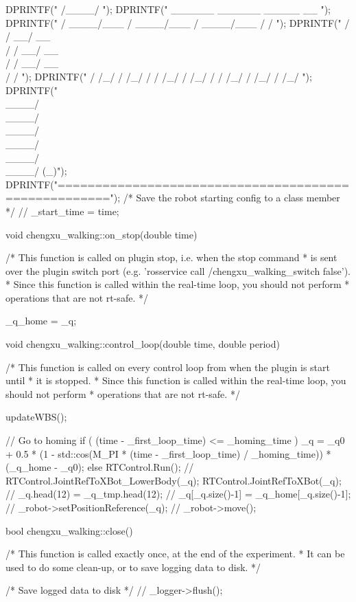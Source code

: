 {{{		DPRINTF("               /____/                                    \n");
		DPRINTF("     ______         ______         _____          __    \n");
		DPRINTF("    / ____/___     / ____/___     / ____/___     / /   \n");
		DPRINTF("   / / __/ __ \\   / / __/ __ \\   / / __/ __ \\   / / \n");
		DPRINTF("  / /_/ / /_/ /  / /_/ / /_/ /  / /_/ / /_/ /  /_/     \n");
		DPRINTF("  \\____/\\____/   \\____/\\____/   \\____/\\____/  (_)\n");
		DPRINTF("\n=====================================================\n\n\n");
	}
	/* Save the robot starting config to a class member */
	// _start_time = time;
}

void chengxu_walking::on_stop(double time)
{
	/* This function is called on plugin stop, i.e. when the stop command
	 * is sent over the plugin switch port (e.g. 'rosservice call /chengxu_walking_switch false').
	 * Since this function is called within the real-time loop, you should not perform
	 * operations that are not rt-safe. */

	_q_home = _q;
}


void chengxu_walking::control_loop(double time, double period)
{
	/* This function is called on every control loop from when the plugin is start until
	 * it is stopped.
	 * Since this function is called within the real-time loop, you should not perform
	 * operations that are not rt-safe. */

	updateWBS();

	// Go to homing
	if ( (time - _first_loop_time) <= _homing_time ) {
		_q = _q0 + 0.5 * (1 - std::cos(M_PI * (time - _first_loop_time) / _homing_time)) * (_q_home - _q0);
	}
	else {
		RTControl.Run();
		// RTControl.JointRefToXBot_LowerBody(_q);
		RTControl.JointRefToXBot(_q);
		// _q.head(12) = _q_tmp.head(12);
	}
	// _q[_q.size()-1] = _q_home[_q.size()-1];
// 	_robot->setPositionReference(_q);
// 	_robot->move();
}

bool chengxu_walking::close()
{
	/* This function is called exactly once, at the end of the experiment.
	 * It can be used to do some clean-up, or to save logging data to disk. */

	/* Save logged data to disk */
	// 	_logger->flush();

}}
